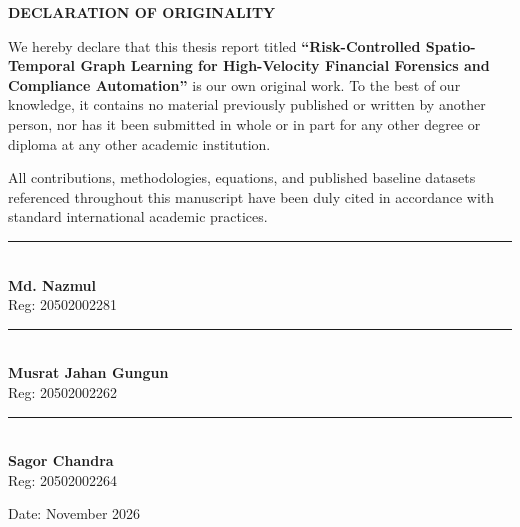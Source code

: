 \begin{center}
   \vspace*{1.0cm}
   {\Large\textbf{DECLARATION OF ORIGINALITY}}\\[1.5cm]
\end{center}

We hereby declare that this thesis report titled \textbf{``Risk-Controlled Spatio-Temporal Graph Learning for High-Velocity Financial Forensics and Compliance Automation''} is our own original work. To the best of our knowledge, it contains no material previously published or written by another person, nor has it been submitted in whole or in part for any other degree or diploma at any other academic institution.

All contributions, methodologies, equations, and published baseline datasets referenced throughout this manuscript have been duly cited in accordance with standard international academic practices.

\vspace{3.0cm}

\noindent
\begin{minipage}{0.31\textwidth}
   \centering
   \rule{4.0cm}{0.4pt}\\[4pt]
   \textbf{Md. Nazmul}\\
   Reg: 20502002281
\end{minipage}
\hfill
\begin{minipage}{0.31\textwidth}
   \centering
   \rule{4.0cm}{0.4pt}\\[4pt]
   \textbf{Musrat Jahan Gungun}\\
   Reg: 20502002262
\end{minipage}
\hfill
\begin{minipage}{0.31\textwidth}
   \centering
   \rule{4.0cm}{0.4pt}\\[4pt]
   \textbf{Sagor Chandra}\\
   Reg: 20502002264
\end{minipage}

\vspace{1.5cm}
\begin{center}
   Date: November 2026
\end{center}
\clearpage
